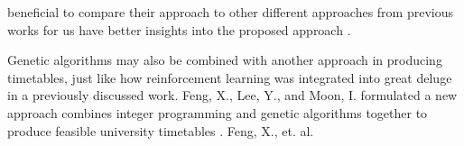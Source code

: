 beneficial to compare their approach to other different approaches from previous works for us have better insights into the proposed approach \cite{raghavjee-ga-south-africa}.

Genetic algorithms may also be combined with another approach in producing timetables, just like how reinforcement learning was integrated into great deluge in a previously discussed work. Feng, X., Lee, Y., and Moon, I. formulated a new approach combines integer programming and genetic algorithms together to produce feasible university timetables \cite{feng-integer-prog-ga}. Feng, X., et. al. 

%
%
%
%
%
%
%
%
%